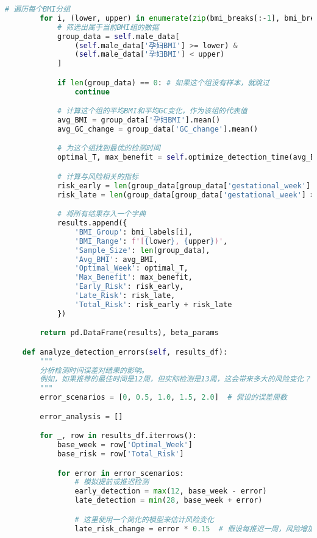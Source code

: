 \documentclass[UTF8, a4paper, 11pt]{ctexart}
\begin{document}
\begin{lstlisting}[language=Python, caption={问题二的解决方案脚本。}]
        # 遍历每个BMI分组
        for i, (lower, upper) in enumerate(zip(bmi_breaks[:-1], bmi_breaks[1:])):
            # 筛选出属于当前BMI组的数据
            group_data = self.male_data[
                (self.male_data['孕妇BMI'] >= lower) &
                (self.male_data['孕妇BMI'] < upper)
            ]

            if len(group_data) == 0: # 如果这个组没有样本，就跳过
                continue

            # 计算这个组的平均BMI和平均GC变化，作为该组的代表值
            avg_BMI = group_data['孕妇BMI'].mean()
            avg_GC_change = group_data['GC_change'].mean()

            # 为这个组找到最优的检测时间
            optimal_T, max_benefit = self.optimize_detection_time(avg_BMI, avg_GC_change, beta_params)

            # 计算与风险相关的指标
            risk_early = len(group_data[group_data['gestational_week'] < 12]) / len(group_data)
            risk_late = len(group_data[group_data['gestational_week'] > 22]) / len(group_data)

            # 将所有结果存入一个字典
            results.append({
                'BMI_Group': bmi_labels[i],
                'BMI_Range': f'[{lower}, {upper})',
                'Sample_Size': len(group_data),
                'Avg_BMI': avg_BMI,
                'Optimal_Week': optimal_T,
                'Max_Benefit': max_benefit,
                'Early_Risk': risk_early,
                'Late_Risk': risk_late,
                'Total_Risk': risk_early + risk_late
            })

        return pd.DataFrame(results), beta_params

    def analyze_detection_errors(self, results_df):
        """
        分析检测时间误差对结果的影响。
        例如，如果推荐的最佳时间是12周，但实际检测是13周，这会带来多大的风险变化？
        """
        error_scenarios = [0, 0.5, 1.0, 1.5, 2.0]  # 假设的误差周数

        error_analysis = []

        for _, row in results_df.iterrows():
            base_week = row['Optimal_Week']
            base_risk = row['Total_Risk']

            for error in error_scenarios:
                # 模拟提前或推迟检测
                early_detection = max(12, base_week - error)
                late_detection = min(28, base_week + error)

                # 这里使用一个简化的模型来估计风险变化
                late_risk_change = error * 0.15  # 假设每推迟一周，风险增加15%


\end{lstlisting}
\end{document}
